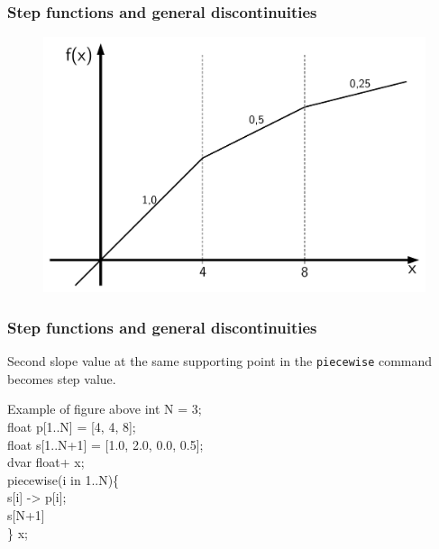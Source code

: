 \begin{frame}
 \frametitle{Step functions and general discontinuities}
 \begin{figure}
  \centering
  \includegraphics[width=\linewidth,page=3]{Bilder/StueckweiseLineareFunktion3}
 \end{figure}
\end{frame}

\begin{frame}
 \frametitle{Step functions and general discontinuities}
 Second slope value at the same supporting point in the \texttt{piecewise} command becomes step value.
 \begin{block}{Example of figure above}\ttfamily\footnotesize
  int N = 3;\\
  float p[1..N] = [4, \alert{4}, 8];\\
  float s[1..N+1] = [1.0, \alert{2.0}, 0.0, 0.5];\\
  dvar float+ x;\\[2ex]  
  piecewise(i in 1..N)\{\\
    \quad s[i] -> p[i];\\
    \quad s[N+1]\\
  \} x;\\
 \end{block}
\end{frame}
